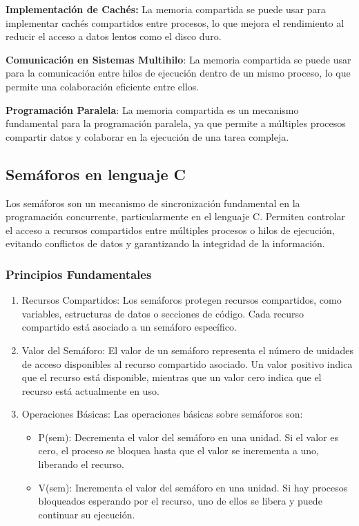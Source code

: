 \textbf{Implementación de Cachés:} La memoria compartida se puede usar para implementar cachés compartidos entre procesos, lo que mejora el rendimiento al reducir el acceso a datos lentos como el disco duro.

\textbf{Comunicación en Sistemas Multihilo}: La memoria compartida se puede usar para la comunicación entre hilos de ejecución dentro de un mismo proceso, lo que permite una colaboración eficiente entre ellos.

\textbf{Programación Paralela}: La memoria compartida es un mecanismo fundamental para la programación paralela, ya que permite a múltiples procesos compartir datos y colaborar en la ejecución de una tarea compleja.

\subsection{Semáforos en lenguaje C}\label{semuxe1foros-en-lenguaje-c}

Los semáforos son un mecanismo de sincronización fundamental en la programación concurrente, particularmente en el lenguaje C. Permiten controlar el acceso a recursos compartidos entre múltiples procesos o hilos de ejecución, evitando conflictos de datos y garantizando la integridad de la información.

\subsubsection{Principios Fundamentales}\label{principios-fundamentales-1}

\begin{enumerate} \def\labelenumi{\arabic{enumi}.} \item   Recursos Compartidos: Los semáforos protegen recursos compartidos,   como variables, estructuras de datos o secciones de código. Cada   recurso compartido está asociado a un semáforo específico. \item   Valor del Semáforo: El valor de un semáforo representa el número de   unidades de acceso disponibles al recurso compartido asociado. Un   valor positivo indica que el recurso está disponible, mientras que un   valor cero indica que el recurso está actualmente en uso. \item   Operaciones Básicas: Las operaciones básicas sobre semáforos son:

          \begin{itemize}   \item     P(sem): Decrementa el valor del semáforo en una unidad. Si el valor     es cero, el proceso se bloquea hasta que el valor se incrementa a     uno, liberando el recurso.   \item     V(sem): Incrementa el valor del semáforo en una unidad. Si hay     procesos bloqueados esperando por el recurso, uno de ellos se libera     y puede continuar su ejecución.   \end{itemize} \end{enumerate}

